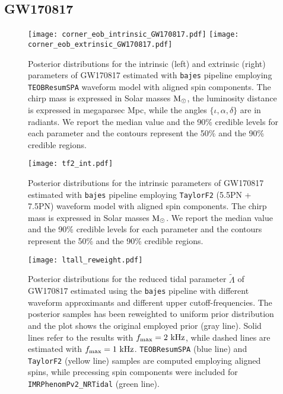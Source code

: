 \documentclass[prd,aps,twocolumn,a4paper,showkeys,nofootinbib,floatfix]{revtex4-1}
\def\Mo{{\rm M_{\odot}}}
\def\tLam{{\tilde\Lambda}}
\newcommand{\bajes}{{\tt bajes}}
\begin{document}
\subsection{GW170817} 
\label{sec:GW170817}

\begin{figure*}[t]
	\centering 
	\texttt{[image: corner\_eob\_intrinsic\_GW170817.pdf]}
	\texttt{[image: corner\_eob\_extrinsic\_GW170817.pdf]}
	\caption{Posterior distributions
		for the intrinsic (left) and extrinsic (right) 
		parameters of GW170817 estimated with
		{\bajes} pipeline employing {\tt TEOBResumSPA} waveform model with aligned spin components.
		The chirp mass is expressed in Solar masses $\Mo$,
		the luminosity distance is expressed in megaparsec Mpc,
		while the angles $\{\iota, \alpha, \delta\}$ are in radiants.
		We report the median value and the 90\% credible levels for each parameter and the contours represent the 50\% and the 90\% credible regions.}
	\label{fig:170817_teob}
\end{figure*}

\begin{figure}[t]
	\centering 
	\texttt{[image: tf2\_int.pdf]}
	\caption{Posterior distributions
		for the intrinsic 
		parameters of GW170817 estimated with
		{\bajes} pipeline employing {\tt TaylorF2} (5.5PN + 7.5PN) 
		waveform model with aligned spin components.
		The chirp mass is expressed in Solar masses $\Mo$.
		We report the median value and the 90\% credible levels for each parameter and the contours represent the 50\% and the 90\% credible regions.}
	\label{fig:170817_tf2}
\end{figure}

\begin{figure}[t]
	\centering 
	\texttt{[image: ltall\_reweight.pdf]}
	\caption{Posterior distributions 
		for the reduced tidal parameter $\tLam$ 
		of GW170817 
		estimated using the {\bajes} pipeline
		with different waveform approximants and different upper cutoff-frequencies.
		The posterior samples has been reweighted to uniform prior distribution and the 
		plot shows the original employed prior (gray line).
		Solid lines refer to the results with $f_{\rm max}=2~{\rm kHz}$, while 
		dashed lines are estimated with $f_{\rm max}=1~{\rm kHz}$.
	{\tt TEOBResumSPA} (blue line) and 
	{\tt TaylorF2} (yellow line) samples
	are computed employing aligned spins, 
	while precessing spin components were included
	for {\tt IMRPhenomPv2\_NRTidal} (green line).}
	\label{fig:lt_all}
\end{figure}
\end{document}
